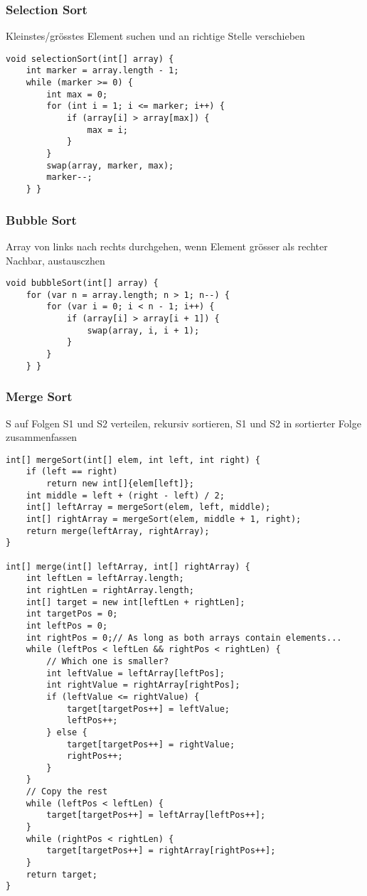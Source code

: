 \begin{multicols*}{5}
		\subsubsection{Selection Sort}
		Kleinstes/grösstes Element suchen und an richtige Stelle verschieben
		
			\begin{lstlisting}
void selectionSort(int[] array) {
	int marker = array.length - 1;
	while (marker >= 0) {
		int max = 0;
		for (int i = 1; i <= marker; i++) {
			if (array[i] > array[max]) {
				max = i;
			}
		}
		swap(array, marker, max);
		marker--;
	} }
			\end{lstlisting}
		
		\subsubsection{Bubble Sort}
		Array von links nach rechts durchgehen, wenn Element grösser als rechter Nachbar, austausczhen
			\begin{lstlisting}
void bubbleSort(int[] array) {
	for (var n = array.length; n > 1; n--) {
		for (var i = 0; i < n - 1; i++) {
			if (array[i] > array[i + 1]) {
				swap(array, i, i + 1);
			}
		}
	} }
			\end{lstlisting}
		
		\subsubsection{Merge Sort}
		S auf Folgen S1 und S2 verteilen, rekursiv sortieren, S1 und S2 in sortierter Folge zusammenfassen
			\begin{lstlisting}
int[] mergeSort(int[] elem, int left, int right) {
	if (left == right)
	  	return new int[]{elem[left]};
	int middle = left + (right - left) / 2;
	int[] leftArray = mergeSort(elem, left, middle);
	int[] rightArray = mergeSort(elem, middle + 1, right);
	return merge(leftArray, rightArray);
}

int[] merge(int[] leftArray, int[] rightArray) {
	int leftLen = leftArray.length;
	int rightLen = rightArray.length;
	int[] target = new int[leftLen + rightLen];
	int targetPos = 0;
	int leftPos = 0;
	int rightPos = 0;// As long as both arrays contain elements...
	while (leftPos < leftLen && rightPos < rightLen) {
		// Which one is smaller?
		int leftValue = leftArray[leftPos];
		int rightValue = rightArray[rightPos];
		if (leftValue <= rightValue) {
			target[targetPos++] = leftValue;
			leftPos++;
		} else {
			target[targetPos++] = rightValue;
			rightPos++;
		}
	}
    // Copy the rest
	while (leftPos < leftLen) {
		target[targetPos++] = leftArray[leftPos++];
	}
	while (rightPos < rightLen) {
		target[targetPos++] = rightArray[rightPos++];
	}
	return target;
}
			\end{lstlisting}
		

\end{multicols*}
